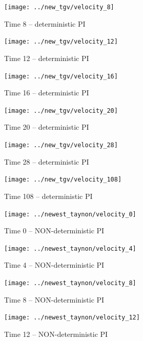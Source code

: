 \begin{figure}[H]
 \centering 
 \texttt{[image: ../new\_tgv/velocity\_8]}
 \label{transitions}
 \caption{Time 8 -- deterministic PI}
\end{figure}

\begin{figure}[H]
 \centering 
 \texttt{[image: ../new\_tgv/velocity\_12]}
 \label{transitions}
 \caption{Time 12 -- deterministic PI}
\end{figure}


\begin{figure}[H]
 \centering 
 \texttt{[image: ../new\_tgv/velocity\_16]}
 \label{transitions}
 \caption{Time 16 -- deterministic PI}
\end{figure}

\begin{figure}[H]
 \centering 
 \texttt{[image: ../new\_tgv/velocity\_20]}
 \label{transitions}
 \caption{Time 20 -- deterministic PI}
\end{figure}


\begin{figure}[H]
 \centering 
 \texttt{[image: ../new\_tgv/velocity\_28]}
 \label{transitions}
 \caption{Time 28 -- deterministic PI}
\end{figure}


\begin{figure}[H]
 \centering 
 \texttt{[image: ../new\_tgv/velocity\_108]}
 \label{transitions}
 \caption{Time 108 -- deterministic PI}
\end{figure}


\begin{figure}[H]
 \centering 
 \texttt{[image: ../newest\_taynon/velocity\_0]}
 \label{transitions}
 \caption{Time 0 -- NON-deterministic PI}
\end{figure}
\begin{figure}[H]
 \centering 
 \texttt{[image: ../newest\_taynon/velocity\_4]}
 \label{transitions}
 \caption{Time 4 -- NON-deterministic PI}
\end{figure}

\begin{figure}[H]
 \centering 
 \texttt{[image: ../newest\_taynon/velocity\_8]}
 \label{transitions}
 \caption{Time 8 -- NON-deterministic PI}
\end{figure}

\begin{figure}[H]
 \centering 
 \texttt{[image: ../newest\_taynon/velocity\_12]}
 \label{transitions}
 \caption{Time 12 -- NON-deterministic PI}
\end{figure}


